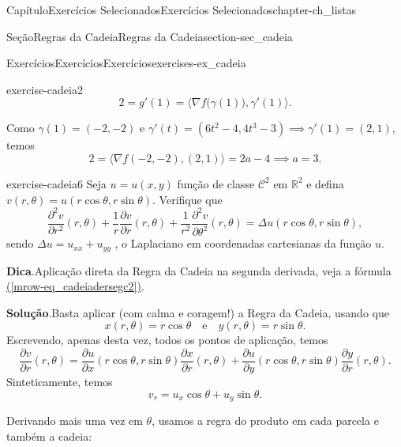 \documentclass[oneside,10pt,]{book}
\newcommand{\blocktitlefont}{\relax}
\newcommand{\xreffont}{\relax}
\numberwithin{equation}{section}
\newcommand{\R}{\mathbb R}
\begin{document}
\begin{chapterptx}{Capítulo}{Exercícios Selecionados}{}{Exercícios Selecionados}{}{}{chapter-ch_listas}
\begin{sectionptx}{Seção}{Regras da Cadeia}{}{Regras da Cadeia}{}{}{section-sec_cadeia}
\begin{exercises-subsection-numberless}{Exercícios}{Exercícios}{}{Exercícios}{}{}{exercises-ex_cadeia}
\begin{divisionexercise}{2}{}{}{exercise-cadeia2}
\begin{equation*}
2=g'(1)=\Big\langle \nabla
f\big(\gamma(1)\big),\gamma'(1)\Big\rangle.
\end{equation*}
%
\par
Como \(\gamma(1)=(-2,-2)\) e \(\gamma'(t)=(6t^2-4,4t^3-3)\implies \gamma'(1)=(2,1)\), temos%
\begin{equation*}
2=\big\langle \nabla
f(-2,-2),(2,1)\big\rangle=2a-4\implies \boxed{a=3}.
\end{equation*}
%
\end{divisionexercise}%
\begin{divisionexercise}{6}{}{}{exercise-cadeia6}%
Seja \(u=u(x,y)\) função de classe \(\mathscr{C}^2\) em \(\R^2\) e defina \(v(r,\theta)=u(r\cos\theta,r\sin\theta)\). Verifique que%
\begin{equation*}
\dfrac{\partial^2 v}{\partial
r^2}(r,\theta)+\dfrac{1}{r}\dfrac{\partial v}{\partial
r}(r,\theta)+\dfrac{1}{r^2}\dfrac{\partial^2
v}{\partial\theta^2}(r,\theta)=\Delta
u(r\cos\theta,r\sin\theta),
\end{equation*}
sendo \(\Delta u = u_{xx} +
u_{yy}\) , o Laplaciano em coordenadas cartesianas da função \(u\).%
\par\smallskip%
\noindent\textbf{\blocktitlefont Dica}.\hypertarget{hint-cadeia6-b}{}\quad{}Aplicação direta da Regra da Cadeia na segunda derivada, veja a fórmula \hyperref[mrow-eq_cadeiadersegc2]{({\xreffont\ref{mrow-eq_cadeiadersegc2}})}.%
\par\smallskip%
\noindent\textbf{\blocktitlefont Solução}.\hypertarget{solution-cadeia6-c}{}\quad{}Basta aplicar (com calma e coragem!) a Regra da Cadeia, usando que%
\begin{equation*}
x(r,\theta)=r\cos\theta\quad\text{e}\quad
y(r,\theta)=r\sin\theta.
\end{equation*}
Escrevendo, apenas desta vez, todos os pontos de aplicação, temos%
\begin{equation*}
\dfrac{\partial v}{\partial r}(r,\theta)
=\dfrac{\partial u}{\partial x}(r\cos\theta,r\sin\theta)
\dfrac{\partial x}{\partial r}(r,\theta)+
\dfrac{\partial u}{\partial y}(r\cos\theta,r\sin\theta)
\dfrac{\partial y}{\partial r}(r,\theta).
\end{equation*}
Sinteticamente, temos%
\begin{equation}
v_r=u_x\cos\theta+u_y\sin\theta.\label{men-cadeia6_vr}
\end{equation}
%
\par
Derivando mais uma vez em \(\theta\), usamos a regra do produto em cada parcela e também a cadeia:%
\begin{equation*}

\end{equation*}
\end{divisionexercise}
\end{exercises-subsection-numberless}
\end{sectionptx}
\end{chapterptx}
\end{document}
